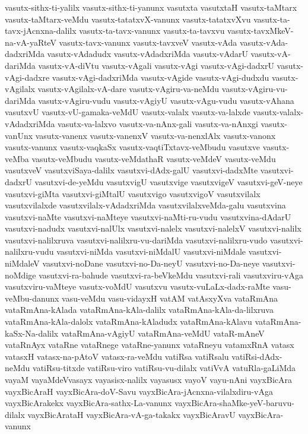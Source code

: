 {vasutx-sithx-ti-yalilx
vasutx-sithx-ti-yanunx
vasutxta
vasutxtaH
vasutx-taMtarx
vasutx-taMtarx-veMdu
vasutx-tatatxvX-vanunx
vasutx-tatatxvXvu
vasutx-ta-tavx-jAcnxna-dalilx
vasutx-ta-tavx-vanunx
vasutx-ta-tavxvu
vasutx-tavxMkeV-na-vA-yaRteV
vasutx-tavx-vanunx
vasutx-tavxveV
vasutx-vAda
vasutx-vAda-dadxriMda
vasutx-vAdadudx
vasutx-vAdadxriMda
vasutx-vAdarU
vasutx-vA-dariMda
vasutx-vA-diVtu
vasutx-vAgali
vasutx-vAgi
vasutx-vAgi-dadxrU
vasutx-vAgi-dadxre
vasutx-vAgi-dadxriMda
vasutx-vAgide
vasutx-vAgi-dudxdu
vasutx-vAgilalx
vasutx-vAgilalx-vA-dare
vasutx-vAgiru-va-neMdu
vasutx-vAgiru-vu-dariMda
vasutx-vAgiru-vudu
vasutx-vAgiyU
vasutx-vAgu-vudu
vasutx-vAhana
vasutxvU
vasutx-vU-gamaka-veMdU
vasutx-valalx
vasutx-va-lalxde
vasutx-valalx-vAdadxriMda
vasutx-va-lalxvo
vasutx-va-nAnx-gali
vasutx-va-nAnxgi
vasutx-vanUnx
vasutx-vanenx
vasutx-vanenxV
vasutx-va-nenxlAlx
vasutx-vanonx
vasutx-vanunx
vasutx-vaqkaSx
vasutx-vaqtiTxtavx-veMbudu
vasutxve
vasutx-veMba
vasutx-veMbudu
vasutx-veMdathaR
vasutx-veMdeV
vasutx-veMdu
vasutxveV
vasutxviSaya-dalilx
vasutxvi-dAdx-galU
vasutxvi-dadxMte
vasutxvi-dadxrU
vasutxvi-de-yeMdu
vasutxvigU
vasutxvige
vasutxvigeV
vasutxvi-geV-neye
vasutxvi-giMta
vasutxvi-giMtalU
vasutxvigo
vasutxvigoV
vasutxvilalx
vasutxvilalxde
vasutxvilalx-vAdadxriMda
vasutxvilalxveMda-galu
vasutxvina
vasutxvi-naMte
vasutxvi-naMteye
vasutxvi-naMti-ru-vudu
vasutxvina-dAdarU
vasutxvi-nadudx
vasutxvi-nalUlx
vasutxvi-nalelx
vasutxvi-nalelxV
vasutxvi-nalilx
vasutxvi-nalilxruva
vasutxvi-nalilxru-vu-dariMda
vasutxvi-nalilxru-vudo
vasutxvi-nalilxru-vudu
vasutxvi-niMda
vasutxvi-niMdalU
vasutxvi-niMdale
vasutxvi-niMdaleV
vasutxvi-noDane
vasutxvi-no-Da-neyU
vasutxvi-no-Da-neye
vasutxvi-noMdige
vasutxvi-ra-bahude
vasutxvi-ra-beVkeMdu
vasutxvi-rali
vasutxviru-vAga
vasutxviru-vaMteye
vasutx-voMdU
vasutxvu
vasutx-vuLaLx-dadx-raMte
vasu-veMbu-danunx
vasu-veMdu
vasu-vidayxH
vatAM
vatAsxyXva
vataRmAna
vataRmAna-kAlada
vataRmAna-kAla-dalilx
vataRmAna-kAla-da-lilxruva
vataRmAna-kAla-dalolx
vataRmAna-kAladudx
vataRmAna-kAlavu
vataRmAna-kaSx-Na-dalilx
vataRmAna-vAgiyU
vataRmAna-veMdU
vataR-mAneV
vataRnAyx
vataRne
vataRnege
vataRne-yanunx
vataRneyu
vatamxRnA
vatasx
vatasxH
vatasx-na-pAtoV
vatasx-ra-veMdu
vatiRsa
vatiRsalu
vatiRsi-dAdx-neMdu
vatiRsu-titxde
vatiRsu-viro
vatiRsu-vu-dilalx
vatiVvA
vatuRla-gaLiMda
vayaM
vayaMdeVvasayx
vayasisx-nalilx
vayasusx
vayoV
vayu-nAni
vayxBicAra
vayxBicAraH
vayxBicAra-doV-Savu
vayxBicAra-jAcnxna-vilalxdiru-vAga
vayxBicArakekx
vayxBicAra-sathx-La-vanunx
vayxBicAra-shaMke-yeV-baruvu-dilalx
vayxBicArataH
vayxBicAra-vA-ga-takakx
vayxBicAravU
vayxBicAra-vanunx
}
